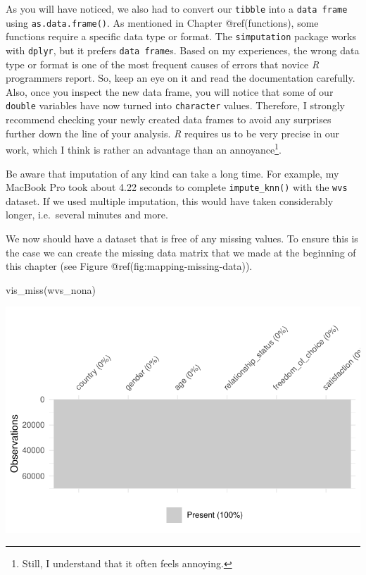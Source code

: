 \documentclass[
  letterpaper,
]{krantz}
\makeatletter
\newenvironment{Shaded}{\begin{snugshade}}{\end{snugshade}}
\newcommand{\FunctionTok}[1]{\textcolor[rgb]{0.28,0.35,0.67}{#1}}
\newcommand{\NormalTok}[1]{\textcolor[rgb]{0.00,0.23,0.31}{#1}}
\newenvironment{kframe}{%
\medskip{}
\setlength{\fboxsep}{.8em}
 \def\at@end@of@kframe{}%
 \ifinner\ifhmode%
  \def\at@end@of@kframe{\end{minipage}}%
  \begin{minipage}{\columnwidth}%
 \fi\fi%
 \def\FrameCommand##1{\hskip\@totalleftmargin \hskip-\fboxsep
 \colorbox{shadecolor}{##1}\hskip-\fboxsep
     \hskip-\linewidth \hskip-\@totalleftmargin \hskip\columnwidth}%
 \MakeFramed {\advance\hsize-\width
   \@totalleftmargin\z@ \linewidth\hsize
   \@setminipage}}%
 {\par\unskip\endMakeFramed%
 \at@end@of@kframe}
\renewenvironment{Shaded}{\begin{kframe}}{\end{kframe}}
\makeatother
\begin{document}
As you will have noticed, we also had to convert our \texttt{tibble}
into a \texttt{data\ frame} using \texttt{as.data.frame()}. As mentioned
in Chapter @ref(functions), some functions require a specific data type
or format. The \texttt{simputation} package works with \texttt{dplyr},
but it prefers \texttt{data\ frame}s. Based on my experiences, the wrong
data type or format is one of the most frequent causes of errors that
novice \emph{R} programmers report. So, keep an eye on it and read the
documentation carefully. Also, once you inspect the new data frame, you
will notice that some of our \texttt{double} variables have now turned
into \texttt{character} values. Therefore, I strongly recommend checking
your newly created data frames to avoid any surprises further down the
line of your analysis. \emph{R} requires us to be very precise in our
work, which I think is rather an advantage than an annoyance\footnote{Still,
  I understand that it often feels annoying.}.

Be aware that imputation of any kind can take a long time. For example,
my MacBook Pro took about 4.22 seconds to complete
\texttt{impute\_knn()} with the \texttt{wvs} dataset. If we used
multiple imputation, this would have taken considerably longer,
i.e.~several minutes and more.

We now should have a dataset that is free of any missing values. To
ensure this is the case we can create the missing data matrix that we
made at the beginning of this chapter (see Figure
@ref(fig:mapping-missing-data)).

\begin{Shaded}
\begin{Highlighting}[]
\FunctionTok{vis\_miss}\NormalTok{(wvs\_nona)}
\end{Highlighting}
\end{Shaded}

\includegraphics{07_data_wrangling_files/figure-pdf/mapping-missing-data-imputed-data-1.pdf}
\end{document}
